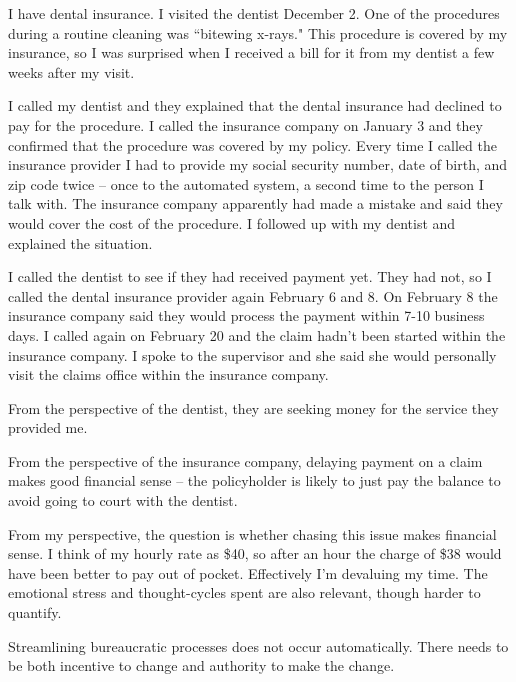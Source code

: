 \begin{mdframed}[frametitle={Dental Insurance},frametitlerule=true,frametitlealignment=\centering]
I have dental insurance. I visited the dentist December 2. One of the procedures during a routine cleaning was ``bitewing x-rays." This procedure is covered by my insurance, so I was surprised when I received a bill for it from my dentist a few weeks after my visit.

I called my dentist and they explained that the dental insurance had declined to pay for the procedure. I called the insurance company on January 3 and they confirmed that the procedure was covered by my policy. 
Every time I called the insurance provider I had to provide my social security number, date of birth, and zip code twice -- once to the automated system, a second time to the person I talk with. The insurance company apparently had made a mistake and said they would cover the cost of the procedure. I followed up with my dentist and explained the situation.

I called the dentist to see if they had received payment yet. They had not, so I called the dental insurance provider again February 6 and 8. On February 8 the insurance company said they would process the payment within 7-10 business days. I called again on February 20 and the claim hadn't been started within the insurance company. I spoke to the supervisor and she said she would personally visit the claims office within the insurance company.

From the perspective of the dentist, they are seeking money for the service they provided me.

From the perspective of the insurance company, delaying payment on a claim makes good financial sense -- the policyholder is likely to just pay the balance to avoid going to court with the dentist.

From my perspective, the question is whether chasing this issue makes financial sense. I think of my hourly rate as \$40, so after an hour the charge of \$38 would have been better to pay out of pocket. Effectively I'm devaluing my time. The emotional stress and thought-cycles spent are also relevant, though harder to quantify.

Streamlining bureaucratic processes does not occur automatically. There needs to be both incentive to change and authority to make the change. 
\end{mdframed}

